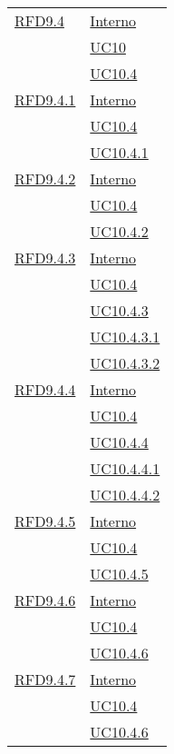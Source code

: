 \begin{longtable}{|>{\centering}m{5cm}|m{5cm}<{\centering}|}
\hyperlink{RFD9.4}{RFD9.4} & \hyperlink{Interno}{Interno}\\
& \hyperref[UC10]{UC10}\\
& \hyperref[UC10.4]{UC10.4}\\ \hline

\hyperlink{RFD9.4.1}{RFD9.4.1} & \hyperlink{Interno}{Interno}\\
& \hyperref[UC10.4]{UC10.4}\\
& \hyperref[UC10.4.1]{UC10.4.1}\\ \hline

\hyperlink{RFD9.4.2}{RFD9.4.2} & \hyperlink{Interno}{Interno}\\
& \hyperref[UC10.4]{UC10.4}\\
& \hyperref[UC10.4.2]{UC10.4.2}\\ \hline

\hyperlink{RFD9.4.3}{RFD9.4.3} & \hyperlink{Interno}{Interno}\\
& \hyperref[UC10.4]{UC10.4}\\
& \hyperref[UC10.4.3]{UC10.4.3}\\
& \hyperref[UC10.4.3.1]{UC10.4.3.1}\\
& \hyperref[UC10.4.3.2]{UC10.4.3.2}\\ \hline

\hyperlink{RFD9.4.4}{RFD9.4.4} & \hyperlink{Interno}{Interno}\\
& \hyperref[UC10.4]{UC10.4}\\
& \hyperref[UC10.4.4]{UC10.4.4}\\
& \hyperref[UC10.4.4.1]{UC10.4.4.1}\\
& \hyperref[UC10.4.4.2]{UC10.4.4.2}\\ \hline

\hyperlink{RFD9.4.5}{RFD9.4.5} & \hyperlink{Interno}{Interno}\\
& \hyperref[UC10.4]{UC10.4}\\
& \hyperref[UC10.4.5]{UC10.4.5}\\ \hline

\hyperlink{RFD9.4.6}{RFD9.4.6} & \hyperlink{Interno}{Interno}\\
& \hyperref[UC10.4]{UC10.4}\\
& \hyperref[UC10.4.6]{UC10.4.6}\\ \hline

\hyperlink{RFD9.4.7}{RFD9.4.7} & \hyperlink{Interno}{Interno}\\
& \hyperref[UC10.4]{UC10.4}\\
& \hyperref[UC10.4.6]{UC10.4.6}\\ \hline


\end{longtable}

